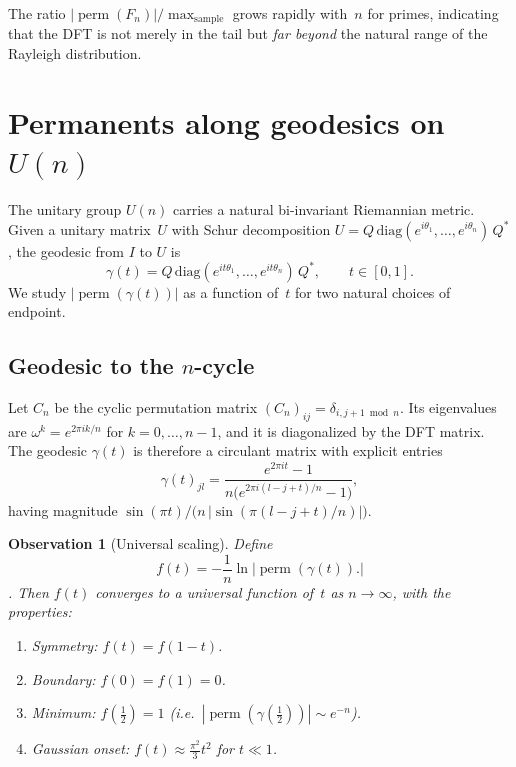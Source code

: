 \documentclass[11pt]{amsart}
\newtheorem{observation}[theorem]{Observation}
\theoremstyle{definition}
\theoremstyle{remark}
\DeclareMathOperator{\perm}{perm}
\begin{document}
The ratio $|\perm(F_n)|/\max_{\text{sample}}$ grows rapidly with~$n$
for primes, indicating that the DFT is not merely in the tail but
\emph{far beyond} the natural range of the Rayleigh distribution.


\section{Permanents along geodesics on $U(n)$}\label{sec:geodesic}

The unitary group $U(n)$ carries a natural bi-invariant Riemannian
metric.  Given a unitary matrix~$U$ with Schur decomposition
$U=Q\,\mathrm{diag}(e^{i\theta_1},\dots,e^{i\theta_n})\,Q^*$,
the geodesic from $I$ to $U$ is
\[
  \gamma(t) = Q\,\mathrm{diag}(e^{it\theta_1},\dots,e^{it\theta_n})\,Q^*,
  \qquad t\in[0,1].
\]
We study $|\perm(\gamma(t))|$ as a function of~$t$ for two natural
choices of endpoint.

\subsection{Geodesic to the $n$-cycle}\label{sec:cycle}

Let $C_n$ be the cyclic permutation matrix $(C_n)_{ij}=\delta_{i,j+1\bmod n}$.
Its eigenvalues are $\omega^k=e^{2\pi ik/n}$ for $k=0,\dots,n-1$,
and it is diagonalized by the DFT matrix.  The geodesic
$\gamma(t)$ is therefore a circulant matrix with explicit entries
\begin{equation}\label{eq:circulant}
  \gamma(t)_{jl}
  = \frac{e^{2\pi it}-1}{n\bigl(e^{2\pi i(l-j+t)/n}-1\bigr)},
\end{equation}
having magnitude $\sin(\pi t)\big/\bigl(n\,|\sin(\pi(l{-}j{+}t)/n)|\bigr)$.

\begin{observation}[Universal scaling]\label{obs:universal}
Define \[f(t)=-\frac{1}{n}\ln|\perm(\gamma(t)).|\].  Then $f(t)$
converges to a universal function of~$t$ as $n\to\infty$, with the
properties:
\begin{enumerate}[label=(\roman*)]
\item Symmetry: $f(t)=f(1-t)$.
\item Boundary: $f(0)=f(1)=0$.
\item Minimum: $f(\tfrac12)=1$ (i.e.\ $|\perm(\gamma(\tfrac12))|\sim e^{-n}$).
\item Gaussian onset: $f(t)\approx \frac{\pi^2}{3}t^2$ for $t\ll 1$.
\end{enumerate}
\end{observation}
\end{document}
